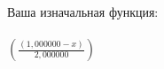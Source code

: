 \documentclass[12pt,a4paper]{scrartcl}
\begin{document}
Ваша изначальная функция: \\
\\{${(\frac{({1,000000}-{x})}{2,000000})}$}\\\\
\end{document}
